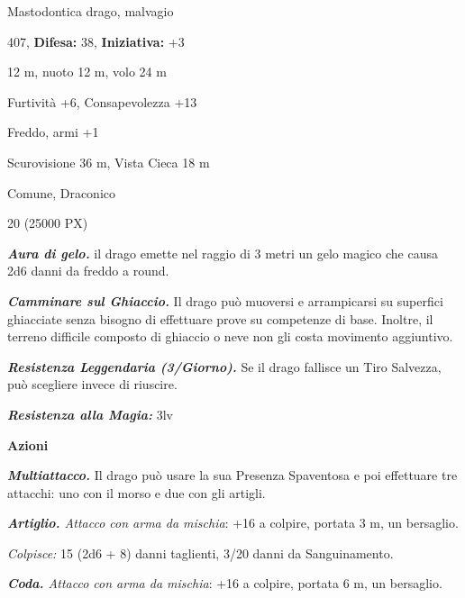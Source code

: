 \begin{multicols}{2}
{
\noindent
\begin{description}[noitemsep, topsep=0pt, parsep=0pt, partopsep=0pt, leftmargin=0cm, labelwidth=2.2cm]
	\item[\textbf{Taglia/Tipo:}] Mastodontica drago, malvagio
	\item[\textbf{Caratt.:}] 
	\item[\textbf{Punti Ferita:}] 407,  \textbf{Difesa:} 38,  \textbf{Iniziativa:} +3
	\item[\textbf{Movimento:}] 12 m, nuoto 12 m, volo 24 m
	\item[\textbf{Tiri Salvez.:}] 
	\item[\textbf{Comp.:}] Furtività +6, Consapevolezza +13
	\item[\textbf{Imm. Danni:}] Freddo, armi +1
	\item[\textbf{Sensi:}] Scurovisione 36 m, Vista Cieca 18 m
	\item[\textbf{Linguaggi:}] Comune, Draconico
	\item[\textbf{Sfida:}] 20 (25000 PX)\smallskip
\end{description}

\emph{\textbf{Aura di gelo.}} il drago emette nel raggio di 3 metri un gelo magico che causa 2d6 danni da freddo a round.

\emph{\textbf{Camminare sul Ghiaccio.}} Il drago può muoversi e arrampicarsi su superfici ghiacciate senza bisogno di effettuare prove su competenze di base. Inoltre, il terreno difficile composto di ghiaccio o neve non gli costa movimento aggiuntivo.

\emph{\textbf{Resistenza Leggendaria (3/Giorno).}} Se il drago fallisce un Tiro Salvezza, può scegliere invece di riuscire.

\emph{\textbf{Resistenza alla Magia:}} 3lv

\textbf{Azioni}

\emph{\textbf{Multiattacco.}} Il drago può usare la sua Presenza Spaventosa e poi effettuare tre attacchi: uno con il morso e due con gli artigli.

\emph{\textbf{Artiglio.} Attacco con arma da mischia}: +16 a colpire, portata 3 m, un bersaglio.

\emph{Colpisce:} 15 (2d6 + 8) danni taglienti, 3/20 danni da Sanguinamento.

\emph{\textbf{Coda.} Attacco con arma da mischia}: +16 a colpire, portata 6 m, un bersaglio.

}
\end{multicols}

